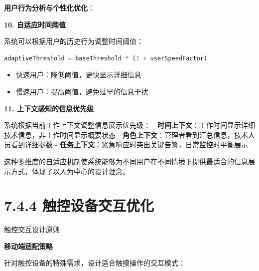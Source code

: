\textbf{用户行为分析与个性化优化}：

\textbf{10. 自适应时间阈值}

系统可以根据用户的历史行为调整时间阈值：

\begin{lstlisting}[language=Javascript]
adaptiveThreshold = baseThreshold * (1 + userSpeedFactor)
\end{lstlisting}

\begin{itemize}
\tightlist
\item
  快速用户：降低阈值，更快显示详细信息
\item
  慢速用户：提高阈值，避免过早的信息干扰
\end{itemize}

\textbf{11. 上下文感知的信息优先级}

系统根据当前工作上下文调整信息展示优先级： - \textbf{时间上下文}：工作时间显示详细技术信息，非工作时间显示概要状态 - \textbf{角色上下文}：管理者看到汇总信息，技术人员看到详细参数 - \textbf{任务上下文}：紧急响应时突出关键告警，日常监控时平衡展示

这种多维度的自适应机制使系统能够为不同用户在不同情境下提供最适合的信息展示方式，体现了以人为中心的设计理念。

\section{7.4.4 触控设备交互优化}

 触控交互设计原则

\textbf{移动端适配策略}

针对触控设备的特殊需求，设计适合触摸操作的交互模式：

